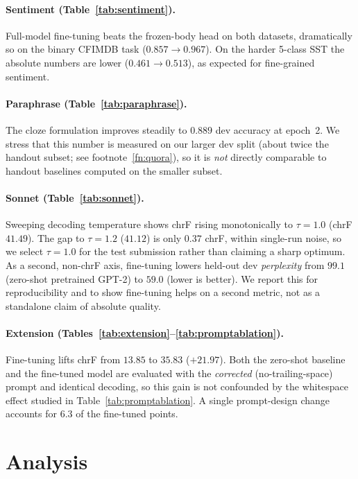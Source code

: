 \documentclass[10pt,twocolumn]{article}
\begin{document}
\paragraph{Sentiment (Table~\ref{tab:sentiment}).} Full-model fine-tuning beats
the frozen-body head on both datasets, dramatically so on the binary CFIMDB task
($0.857 \rightarrow 0.967$). On the harder 5-class SST the absolute numbers are
lower ($0.461 \rightarrow 0.513$), as expected for fine-grained sentiment.

\paragraph{Paraphrase (Table~\ref{tab:paraphrase}).} The cloze formulation
improves steadily to $0.889$ dev accuracy at epoch~2. We stress that this number
is measured on our larger dev split (about twice the handout subset; see
footnote~\ref{fn:quora}), so it is \emph{not} directly comparable to handout
baselines computed on the smaller subset.

\paragraph{Sonnet (Table~\ref{tab:sonnet}).} Sweeping decoding temperature shows
chrF rising monotonically to $\tau=1.0$ (chrF $41.49$). The gap to $\tau=1.2$
($41.12$) is only $0.37$ chrF, within single-run noise, so we select $\tau=1.0$
for the test submission rather than claiming a sharp optimum. As a second,
non-chrF axis, fine-tuning lowers held-out dev \emph{perplexity} from $99.1$
(zero-shot pretrained GPT-2) to $59.0$ (lower is better). We report this for
reproducibility and to show fine-tuning helps on a second metric, not as a
standalone claim of absolute quality.

\paragraph{Extension (Tables~\ref{tab:extension}--\ref{tab:promptablation}).}
Fine-tuning lifts chrF from $13.85$ to $35.83$ ($+21.97$). Both the zero-shot
baseline and the fine-tuned model are evaluated with the \emph{corrected}
(no-trailing-space) prompt and identical decoding, so this gain is not confounded
by the whitespace effect studied in Table~\ref{tab:promptablation}. A single
prompt-design change accounts for $6.3$ of the fine-tuned points.

\section{Analysis}
\label{sec:analysis}
\end{document}
